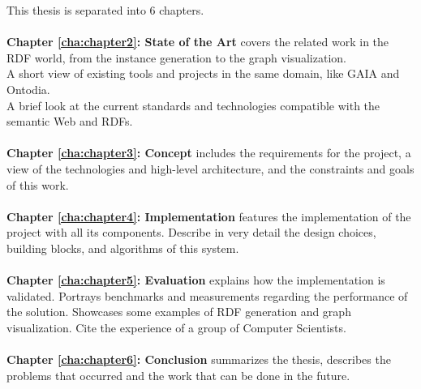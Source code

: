 This thesis is separated into 6 chapters.
\\
\\
\textbf{Chapter \ref{cha:chapter2}: State of the Art} covers the related work in the RDF world, from the instance generation to the graph visualization. 
\\
A short view of existing tools and projects in the same domain, like GAIA and Ontodia.
\\
A brief look at the current standards and technologies compatible with the semantic Web and RDFs.
\\
\\
\textbf{Chapter \ref{cha:chapter3}: Concept} includes the requirements for the project, a view of the technologies and high-level architecture, and the constraints and goals of this work.
\\
\\
\textbf{Chapter \ref{cha:chapter4}: Implementation} features the implementation of the project with all its components. Describe in very detail the design choices, building blocks, and algorithms of this system.
\\
\\
\textbf{Chapter \ref{cha:chapter5}: Evaluation} explains how the implementation is validated. Portrays benchmarks and measurements regarding the performance of the solution. Showcases some examples of RDF generation and graph visualization. Cite the experience of a group of Computer Scientists. 
\\
\\
\textbf{Chapter \ref{cha:chapter6}: Conclusion} summarizes the thesis, describes the problems that occurred and the work that can be done in the future. 